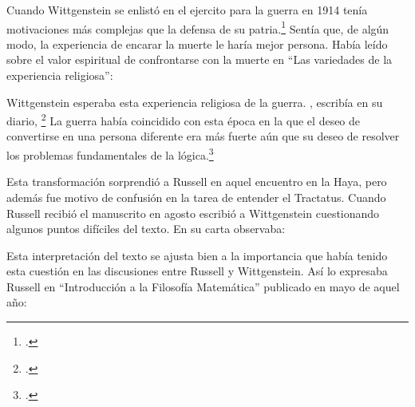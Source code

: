     Cuando Wittgenstein se enlistó en el ejercito para la guerra en 1914 tenía
    motivaciones más complejas que la defensa de su patria.\footcite[loc2276]{monk}
    Sentía que, de algún modo, la experiencia de encarar la muerte le haría mejor
    persona. Había leído sobre el valor espiritual de confrontarse con la muerte en
    ``Las variedades de la experiencia religiosa'':

    Wittgenstein esperaba esta experiencia religiosa de la guerra.
    , escribía en su diario, \footcite[loc2295]{monk}
    La guerra había coincidido con esta época en la que el deseo de convertirse en
    una persona diferente era más fuerte aún que su deseo de resolver los problemas
    fundamentales de la lógica.\footcite[loc2305]{monk}

    Esta transformación sorprendió a Russell en aquel encuentro en la Haya, pero
    además fue motivo de confusión en la tarea de entender el Tractatus. Cuando
    Russell recibió el manuscrito en agosto escribió a Wittgenstein cuestionando
    algunos puntos difíciles del texto. En su carta observaba: 

    Esta interpretación del texto se ajusta bien a la importancia que había tenido
    esta cuestión en las discusiones entre Russell y Wittgenstein. Así lo expresaba
    Russell en ``Introducción a la Filosofía Matemática'' publicado en mayo de aquel
    año: 

